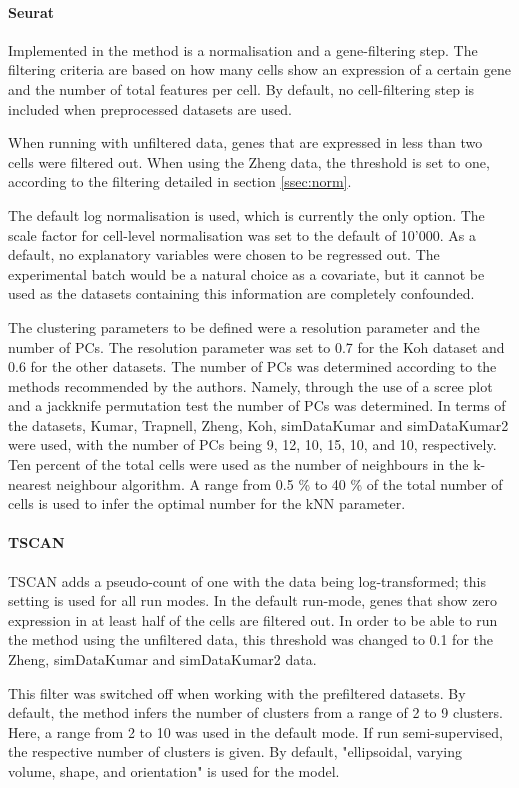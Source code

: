 \documentclass[11pt, a4paper]{article}\usepackage[]{graphicx}\usepackage[]{color}
\begin{document}
\paragraph{Seurat}
Implemented in the method is a normalisation and a gene-filtering step. The filtering criteria are based on how many cells show an expression of a certain gene and the number of total features per cell. By default, no cell-filtering step is included when preprocessed datasets are used.

When running with unfiltered data, genes that are expressed in less than two cells were filtered out. When using the Zheng data, the threshold is set to one, according to the filtering detailed in section \ref{ssec:norm}.

The default log normalisation is used, which is currently the only option. The scale factor for cell-level normalisation was set to the default of 10'000. 
As a default, no explanatory variables were chosen to be regressed out. The experimental batch would be a natural choice as a covariate, but it cannot be used as the datasets containing this information are completely confounded.

The clustering parameters to be defined were a resolution parameter and the number of PCs. The resolution parameter was set to 0.7 for the Koh dataset and 0.6 for the other datasets. 
The number of PCs was determined according to the methods recommended by the authors. Namely, through the use of a scree plot and a jackknife permutation test the number of PCs was determined. 
In terms of the datasets, Kumar, Trapnell, Zheng, Koh, simDataKumar and simDataKumar2 were used, with the number of PCs being  9, 12, 10, 15, 10, and 10, respectively.
Ten percent of the total cells were used as the number of neighbours in the k-nearest neighbour algorithm.  A range from 0.5 \% to 40 \% of the total number of cells is used to infer the optimal number for the kNN parameter.


\paragraph{TSCAN}
TSCAN adds a pseudo-count of one with the data being log-transformed; this setting is used for all run modes. 
In the default run-mode, genes that show zero expression in at least half of the cells are filtered out. In order to be able to run the method using the unfiltered data, this threshold was changed to 0.1 for the Zheng, simDataKumar and simDataKumar2 data.

This filter was switched off when working with the prefiltered datasets. By default, the method infers the number of clusters from a range of 2 to 9 clusters. Here, a range from 2 to 10 was used in the default mode. If run semi-supervised, the respective number of clusters is given. By default, "ellipsoidal, varying volume, shape, and orientation" is used for the model.
\end{document}
